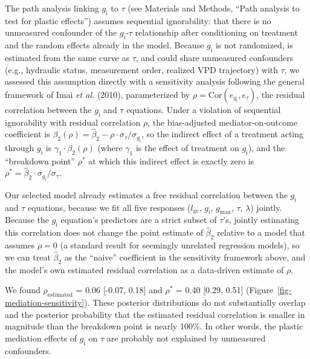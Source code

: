 \documentclass[
  letterpaper,
  DIV=11,
  numbers=noendperiod]{scrartcl}
\newcommand{\gcl}{$l_\mathrm{gc}$}
\newcommand{\gi}{$g_\mathrm{i}$}
\newcommand{\gmax}{$g_\mathrm{max}$}
\begin{document}
The path analysis linking \gi{} to \(\tau\) (see Materials and Methods,
``Path analysis to test for plastic effects'') assumes sequential
ignorability: that there is no unmeasured confounder of the
\gi{}-\(\tau\) relationship after conditioning on treatment and the
random effects already in the model. Because \gi{} is not randomized, is
estimated from the same curve as \(\tau\), and could share unmeasured
confounders (e.g., hydraulic status, measurement order, realized VPD
trajectory) with \(\tau\), we assessed this assumption directly with a
sensitivity analysis following the general framework of Imai \emph{et
al.} (2010), parameterized by
\(\rho = \mathrm{Cor}(e_{g_\mathrm{i}}, e_\tau)\), the residual
correlation between the \gi{} and \(\tau\) equations. Under a violation
of sequential ignorability with residual correlation \(\rho\), the
bias-adjusted mediator-on-outcome coefficient is
\(\beta_2(\rho) = \hat\beta_2 - \rho \cdot \sigma_\tau / \sigma_{g_\mathrm{i}}\),
so the indirect effect of a treatment acting through \gi{} is
\(\gamma_1 \cdot \beta_2(\rho)\) (where \(\gamma_1\) is the effect of
treatment on \gi), and the ``breakdown point'' \(\rho^*\) at which this
indirect effect is exactly zero is
\(\rho^* = \hat\beta_2 \cdot \sigma_{g_\mathrm{i}} / \sigma_\tau\).

Our selected model already estimates a free residual correlation between
the \gi{} and \(\tau\) equations, because we fit all five responses
(\gcl, \gi, \gmax, \(\tau\), \(\lambda\)) jointly. Because the \gi{}
equation's predictors are a strict subset of \(\tau\)'s, jointly
estimating this correlation does not change the point estimate of
\(\hat\beta_2\) relative to a model that assumes \(\rho = 0\) (a
standard result for seemingly unrelated regression models), so we can
treat \(\hat\beta_2\) as the ``naive'' coefficient in the sensitivity
framework above, and the model's own estimated residual correlation as a
data-driven estimate of \(\rho\).

We found \(\rho_\mathrm{estimated}\) = 0.06 {[}-0.07, 0.18{]} and
\(\rho^*\) = 0.40 {[}0.29, 0.51{]}
(Figure~\ref{fig-mediation-sensitivity}). These posterior distributions
do not substantially overlap and the posterior probability that the
estimated residual correlation is smaller in magnitude than the
breakdown point is nearly 100\%. In other words, the plastic mediation
effects of \gi{} on \(\tau\) are probably not explained by unmeasured
confounders.
\end{document}
